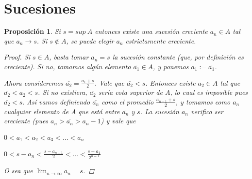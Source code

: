 \documentclass[]{article}
\newtheorem{prop}[teo]{Proposición}
\begin{document}
\section{Sucesiones}
\begin{prop}
	Si $s = sup\ A$ entonces existe una sucesión creciente ${a_n} \in A$ tal que $a_n \rightarrow s$. Si $s \not\in A$, se puede elegir $a_n$ estrictamente creciente.
\begin{proof}
	Si $s \in A$, basta tomar $a_n = s$ la sucesión constante (que, por definición es creciente). Si no, tomamos algún elemento $\overline{a_1} \in A$, y ponemos $a_1 := \overline{a_1}$. 
	
	Ahora consideremos $\overline{a_2} = \frac{a_1 + s}{2}$. Vale que $\overline{a_2} < s$. Entonces existe $a_2 \in A$ tal que $\overline{a_2} < a_2 < s$. Si no existiera, $\overline{a_2}$ sería cota superior de $A$, lo cual es imposible pues $\overline{a_2} < s.$ Así vamos definiendo $\overline{a_n}$ como el promedio $\frac{a_{n-1}+s}{2}$, y tomamos como $a_n$ cualquier elemento de A que está entre $\overline{a_n}$ y $s$. La sucesión $a_n$ verifica ser creciente (pues $a_n > \overline{a_n} > a_n-1$) y vale que
	
	\begin{center}
		$0 < a_1 < a_2 < a_3 < \hdots < a_n$
	\end{center}
	\begin{center}
		$0 < s-a_n < \frac{s-a_{n-1}}{2} < \hdots < \frac{s-a_1}{2^{n-1}}$
	\end{center}
	O sea que $\displaystyle \lim_{n \to \infty} a_n = s$.
\end{proof}
\end{prop}
\end{document}
